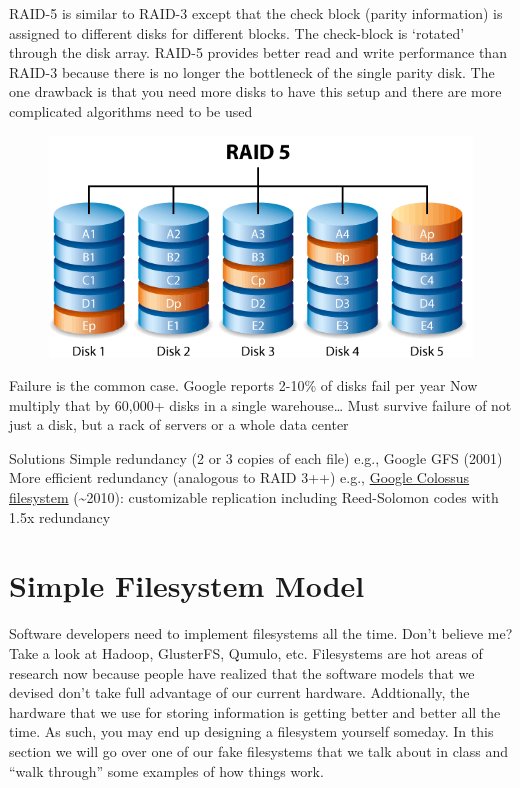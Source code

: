 RAID-5 is similar to RAID-3 except that the check block (parity information) is assigned to different disks for different blocks. The check-block is `rotated' through the disk array. RAID-5 provides better read and write performance than RAID-3 because there is no longer the bottleneck of the single parity disk. The one drawback is that you need more disks to have this setup and there are more complicated algorithms need to be used

\begin{figure}[htbp]
\centering
\includegraphics[width=.8\textwidth]{filesystems/images/raid_5.png}
\caption{}
\end{figure}

Failure is the common case. Google reports 2-10\% of disks fail per year Now multiply that by 60,000+ disks in a single warehouse\ldots{} Must survive failure of not just a disk, but a rack of servers or a whole data center

Solutions Simple redundancy (2 or 3 copies of each file) e.g., Google GFS (2001) More efficient redundancy (analogous to RAID 3++) e.g., \href{http://goo.gl/LwFIy}{Google Colossus filesystem} (\textasciitilde{}2010): customizable replication including Reed-Solomon codes with 1.5x redundancy

\section{Simple Filesystem Model}

Software developers need to implement filesystems all the time. Don't believe me? Take a look at Hadoop, GlusterFS,
Qumulo, etc. Filesystems are hot areas of research now because people have realized that the software models that we
devised don't take full advantage of our current hardware. Addtionally, the hardware that we use for storing information
is getting better and better all the time. As such, you may end up designing a filesystem yourself someday. In this
section we will go over one of our fake filesystems that we talk about in class and ``walk through'' some examples of
how things work.

